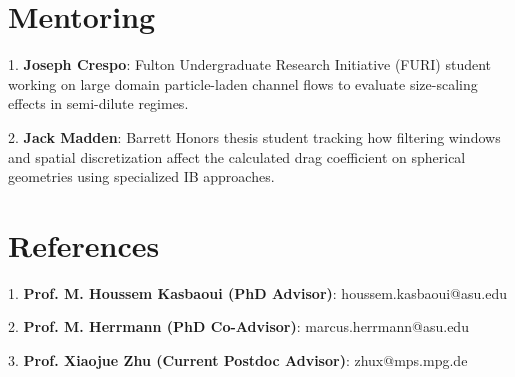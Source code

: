 \documentclass[letterpaper,10.8pt]{article}
\begin{document}
\section{Mentoring}
\begin{description}
\item {1. \textbf{Joseph Crespo}: Fulton Undergraduate Research Initiative (FURI) student working on large domain particle-laden channel flows to evaluate size-scaling effects in semi-dilute regimes.} 
\item {2. \textbf{Jack Madden}: Barrett Honors thesis student tracking how filtering windows and spatial discretization affect the calculated drag coefficient on spherical geometries using specialized IB approaches.}
\end{description}

\section{References}
\begin{description}
\item {1. \textbf{Prof. M. Houssem Kasbaoui (PhD Advisor)}: houssem.kasbaoui@asu.edu}
\item {2. \textbf{Prof. M. Herrmann (PhD Co-Advisor)}: marcus.herrmann@asu.edu}
\item {3. \textbf{Prof. Xiaojue Zhu (Current Postdoc Advisor)}: zhux@mps.mpg.de}
\end{description}
\end{document}

